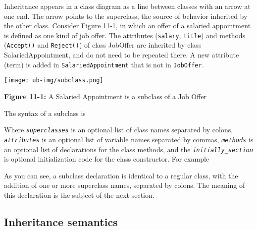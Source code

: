 Inheritance appears in a class diagram as a line between classes with an
arrow at one end. The arrow points to the superclass, the source of
behavior inherited by the other class. Consider Figure 11-1, in which
an offer of a salaried appointment is defined as one kind of job offer.
The attributes (\texttt{salary}, \texttt{title}) and methods
(\texttt{Accept()} and \texttt{Reject()}) of class JobOffer are
inherited by class SalariedAppointment, and do not need to be repeated
there. A new attribute (term) is added in \texttt{SalariedAppointment}
that is not in \texttt{JobOffer}.

\begin{center}
\texttt{[image: ub-img/subclass.png]}

{\sffamily\bfseries Figure 11-1:}
{\sffamily A Salaried Appointment is a subclass of a Job Offer}
\end{center}

\noindent
The syntax of a subclass is


Where \texttt{\textit{superclasses}} is an optional list of class names
separated by colons, \texttt{\textit{attributes}} is an optional list
of variable names separated by commas,
\texttt{\textit{methods}} is an optional list of declarations for the
class methods, and the \texttt{\textit{initially\_section}} is optional
initialization code for the class constructor. For
example


As you can see, a subclass declaration is identical to a regular class,
with the addition of one or more superclass names, separated by colons.
The meaning of this declaration is the subject of the next section.

\subsection*{Inheritance semantics}

